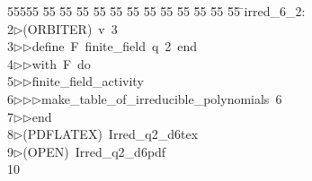 %
%
\begin{tabbing}
55555 \= 55 \= 55 \= 55 \= 55 \= 55 \= 55 \= 55 \= 55 \= 55 \= 55 \= 55 \= 55 \= \>irred\_6\_2:\\[0pt]
2\>$\triangleright$\>(ORBITER)\ v\ 3\ \\[0pt]
3\>$\triangleright$\>$\triangleright$\>define\ F\ finite\_field\ q\ 2\ end\ \\[0pt]
4\>$\triangleright$\>$\triangleright$\>with\ F\ do\ \\[0pt]
5\>$\triangleright$\>$\triangleright$\>finite\_field\_activity\ \\[0pt]
6\>$\triangleright$\>$\triangleright$\>$\triangleright$\>make\_table\_of\_irreducible\_polynomials\ 6\ \\[0pt]
7\>$\triangleright$\>$\triangleright$\>end\\[0pt]
8\>$\triangleright$\>(PDFLATEX)\ Irred\_q2\_d6tex\\[0pt]
9\>$\triangleright$\>(OPEN)\ Irred\_q2\_d6pdf\\[0pt]
10\>\end{tabbing}
